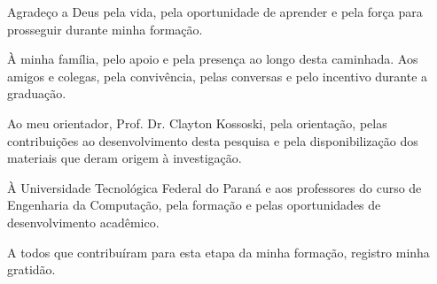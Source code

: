 \begin{agradecimentos}
Agradeço a Deus pela vida, pela oportunidade de aprender e pela força para prosseguir durante minha formação.

À minha família, pelo apoio e pela presença ao longo desta caminhada. Aos amigos e colegas, pela convivência, pelas conversas e pelo incentivo durante a graduação.

Ao meu orientador, Prof. Dr. Clayton Kossoski, pela orientação, pelas contribuições ao desenvolvimento desta pesquisa e pela disponibilização dos materiais que deram origem à investigação.

À Universidade Tecnológica Federal do Paraná e aos professores do curso de Engenharia da Computação, pela formação e pelas oportunidades de desenvolvimento acadêmico.

A todos que contribuíram para esta etapa da minha formação, registro minha gratidão.
\end{agradecimentos}
